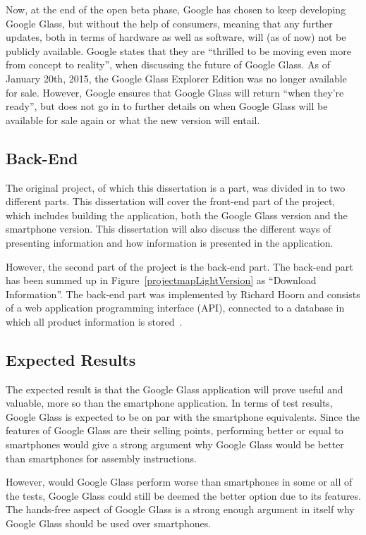 Now, at the end of the open beta phase, Google has chosen to keep developing Google Glass, but without the help of consumers, meaning that any further updates, both in terms of hardware as well as software, will (as of now) not be publicly available. Google states that they are ``thrilled to be moving even more from concept to reality'', when discussing the future of Google Glass. As of January 20th, 2015, the Google Glass Explorer Edition was no longer available for sale. However, Google ensures that Google Glass will return ``when they're ready'', but does not go in to further details on when Google Glass will be available for sale again or what the new version will entail. 

\subsection{Back-End}
The original project, of which this dissertation is a part, was divided in to two different parts. This dissertation will cover the front-end part of the project, which includes building the application, both the Google Glass version and the smartphone version. This dissertation will also discuss the different ways of presenting information and how information is presented in the application.

However, the second part of the project is the back-end part. The back-end part has been summed up in Figure~\ref{projectmapLightVersion} as ``Download Information''. The back-end part was implemented by Richard Hoorn and consists of a web application programming interface (API), connected to a database in which all product information is stored~\cite{hoorn}. 

\subsection{Expected Results}
The expected result is that the Google Glass application will prove useful and valuable, more so than the smartphone application. In terms of test results, Google Glass is expected to be on par with the smartphone equivalents. Since the features of Google Glass are their selling points, performing better or equal to smartphones would give a strong argument why Google Glass would be better than smartphones for assembly instructions.

However, would Google Glass perform worse than smartphones in some or all of the tests, Google Glass could still be deemed the better option due to its features. The hands-free aspect of Google Glass is a strong enough argument in itself why Google Glass should be used over smartphones. 

